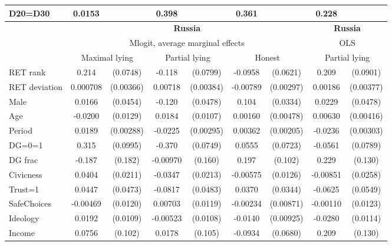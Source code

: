 \begin{tabular}{l|cccccc|cc}
D20=D30         &   0.0153         &         &    0.398         &         &    0.361         &         &    0.228         &         \\
\hline\hline
&\multicolumn{6}{c|}{\bf Russia}&\multicolumn{2}{c}{\bf Russia}\\ &\multicolumn{6}{c|}{Mlogit, average marginal effects }&\multicolumn{2}{c}{OLS}\\
                &\multicolumn{2}{c}{Maximal lying}&\multicolumn{2}{c}{Partial lying}&\multicolumn{2}{c}{Honest}  &\multicolumn{2}{c}{Partial lying}\\
\hline
RET rank        &    0.214\sym{***}& (0.0748)&   -0.118         & (0.0799)&  -0.0958         & (0.0621)&    0.209\sym{**} & (0.0901)\\
RET deviation   & 0.000708         &(0.00366)&  0.00718\sym{*}  &(0.00384)& -0.00789\sym{***}&(0.00297)&  0.00186         &(0.00377)\\
Male            &   0.0166         & (0.0454)&   -0.120\sym{**} & (0.0478)&    0.104\sym{***}& (0.0334)&   0.0229         & (0.0478)\\
Age             &  -0.0200         & (0.0129)&   0.0184\sym{*}  & (0.0107)&  0.00160         &(0.00478)&  0.00630         &(0.00416)\\
Period          &   0.0189\sym{***}&(0.00288)&  -0.0225\sym{***}&(0.00295)&  0.00362\sym{*}  &(0.00205)&  -0.0236\sym{***}&(0.00303)\\
DG=0=1          &    0.315\sym{***}& (0.0995)&   -0.370\sym{***}& (0.0749)&   0.0555         & (0.0723)&  -0.0561         & (0.0789)\\
DG frac         &   -0.187         &  (0.182)& -0.00970         &  (0.160)&    0.197\sym{*}  &  (0.102)&    0.229\sym{*}  &  (0.130)\\
Civicness       &   0.0404\sym{*}  & (0.0211)&  -0.0347         & (0.0213)& -0.00575         & (0.0126)& -0.00851         & (0.0258)\\
Trust=1         &   0.0447         & (0.0473)&  -0.0817\sym{*}  & (0.0483)&   0.0370         & (0.0344)&  -0.0625         & (0.0549)\\
SafeChoices     & -0.00469         & (0.0120)&  0.00703         & (0.0119)& -0.00234         &(0.00871)& -0.00110         & (0.0123)\\
Ideology        &   0.0192\sym{*}  & (0.0109)& -0.00523         & (0.0108)&  -0.0140         &(0.00925)&  -0.0280\sym{**} & (0.0114)\\
Income          &   0.0756         &  (0.102)&   0.0178         &  (0.105)&  -0.0934         & (0.0680)&    0.209         &  (0.130)\\

\end{tabular}
